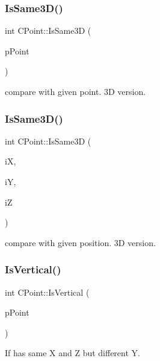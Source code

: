 \subsubsection{\texorpdfstring{IsSame3D()}{IsSame3D()}\hspace{0.1cm}{\footnotesize\ttfamily [1/2]}}
{\footnotesize\ttfamily int C\+Point\+::\+Is\+Same3D (\begin{DoxyParamCaption}\item[{\mbox{\hyperlink{classCPoint}{C\+Point}} $\ast$}]{p\+Point }\end{DoxyParamCaption})}



compare with given point. 3D version. 

\mbox{\label{classCPoint_ad6ed4f9141fd7ec648cb508bffe7edc2}} 
\subsubsection{\texorpdfstring{IsSame3D()}{IsSame3D()}\hspace{0.1cm}{\footnotesize\ttfamily [2/2]}}
{\footnotesize\ttfamily int C\+Point\+::\+Is\+Same3D (\begin{DoxyParamCaption}\item[{int}]{iX,  }\item[{int}]{iY,  }\item[{int}]{iZ }\end{DoxyParamCaption})}



compare with given position. 3D version. 

\mbox{\label{classCPoint_a888633c67f146c390bd3434850497f1f}} 
\subsubsection{\texorpdfstring{IsVertical()}{IsVertical()}}
{\footnotesize\ttfamily int C\+Point\+::\+Is\+Vertical (\begin{DoxyParamCaption}\item[{\mbox{\hyperlink{classCPoint}{C\+Point}} $\ast$}]{p\+Point }\end{DoxyParamCaption})}



If has same X and Z but different Y. 

